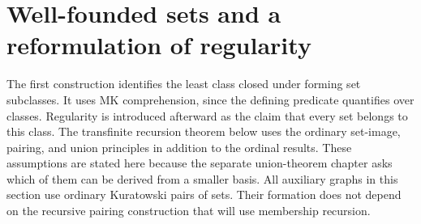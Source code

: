 \def\topic{Induction \& Recursion}

\section{Well-founded sets and a reformulation of regularity}
The first construction identifies the least class closed under forming set
subclasses. It uses MK comprehension, since the defining predicate
quantifies over classes. Regularity is introduced afterward as the claim
that every set belongs to this class. The transfinite recursion theorem below uses the ordinary set-image,
pairing, and union principles in addition to the ordinal results. These
assumptions are stated here because the separate union-theorem chapter
asks which of them can be derived from a smaller basis.
All auxiliary graphs in this section use ordinary Kuratowski pairs of
sets. Their formation does not depend on the recursive pairing construction
that will use membership recursion.

